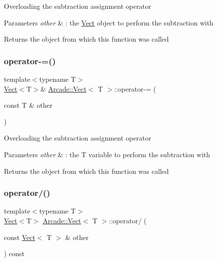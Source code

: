 Overloading the subtraction assignment operator 
\begin{DoxyParams}{Parameters}
{\em other} & \+: the \hyperlink{class_arcade_1_1_vect}{Vect} object to perform the subtraction with \\
\hline
\end{DoxyParams}
\begin{DoxyReturn}{Returns}
the object from which this function was called 
\end{DoxyReturn}
\mbox{\label{class_arcade_1_1_vect_a0c2f3a86672b88f6baec98b5f2e9ad49}} 
\subsubsection{\texorpdfstring{operator-\/=()}{operator-=()}\hspace{0.1cm}{\footnotesize\ttfamily [2/2]}}
{\footnotesize\ttfamily template$<$typename T$>$ \\
\hyperlink{class_arcade_1_1_vect}{Vect}$<$T$>$\& \hyperlink{class_arcade_1_1_vect}{Arcade\+::\+Vect}$<$ T $>$\+::operator-\/= (\begin{DoxyParamCaption}\item[{const T \&}]{other }\end{DoxyParamCaption})\hspace{0.3cm}{\ttfamily [inline]}}

Overloading the subtraction assignment operator 
\begin{DoxyParams}{Parameters}
{\em other} & \+: the T variable to perform the subtraction with \\
\hline
\end{DoxyParams}
\begin{DoxyReturn}{Returns}
the object from which this function was called 
\end{DoxyReturn}
\mbox{\label{class_arcade_1_1_vect_ae34d76a3387c62538f9c20c8acb42fa6}} 
\subsubsection{\texorpdfstring{operator/()}{operator/()}\hspace{0.1cm}{\footnotesize\ttfamily [1/2]}}
{\footnotesize\ttfamily template$<$typename T$>$ \\
\hyperlink{class_arcade_1_1_vect}{Vect}$<$T$>$ \hyperlink{class_arcade_1_1_vect}{Arcade\+::\+Vect}$<$ T $>$\+::operator/ (\begin{DoxyParamCaption}\item[{const \hyperlink{class_arcade_1_1_vect}{Vect}$<$ T $>$ \&}]{other }\end{DoxyParamCaption}) const\hspace{0.3cm}{\ttfamily [inline]}}

